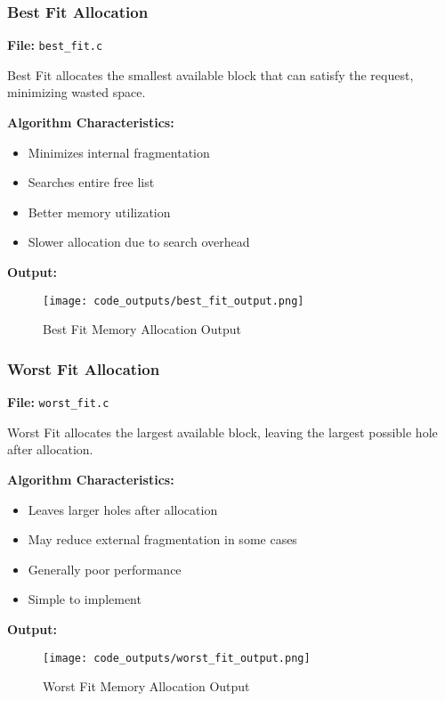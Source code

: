\documentclass[12pt,a4paper]{article}
\begin{document}
\vspace{3cm}

\subsubsection{Best Fit Allocation}
\textbf{File:} \texttt{best\_fit.c}

Best Fit allocates the smallest available block that can satisfy the request, minimizing wasted space.

\textbf{Algorithm Characteristics:}
\begin{itemize}
    \item Minimizes internal fragmentation
    \item Searches entire free list
    \item Better memory utilization
    \item Slower allocation due to search overhead
\end{itemize}

\textbf{Output:}
\begin{figure}[H]
    \centering
    \texttt{[image: code\_outputs/best\_fit\_output.png]}
    \caption{Best Fit Memory Allocation Output}
    \label{fig:best_fit_output}
\end{figure}

\vspace{3cm}

\subsubsection{Worst Fit Allocation}
\textbf{File:} \texttt{worst\_fit.c}

Worst Fit allocates the largest available block, leaving the largest possible hole after allocation.

\textbf{Algorithm Characteristics:}
\begin{itemize}
    \item Leaves larger holes after allocation
    \item May reduce external fragmentation in some cases
    \item Generally poor performance
    \item Simple to implement
\end{itemize}

\textbf{Output:}
\begin{figure}[H]
    \centering
    \texttt{[image: code\_outputs/worst\_fit\_output.png]}
    \caption{Worst Fit Memory Allocation Output}
    \label{fig:worst_fit_output}
\end{figure}
\end{document}
